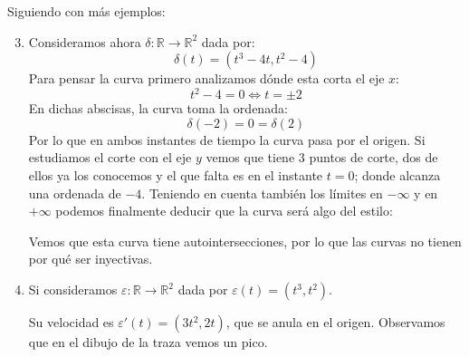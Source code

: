\begin{ejemplo}
    Siguiendo con más ejemplos:
    \begin{enumerate}
        \setcounter{enumi}{2}
        \item Consideramos ahora $\delta:\mathbb{R}\to \mathbb{R}^2$ dada por:
            \begin{equation*}
                \delta(t) = (t^3-4t, t^2-4)
            \end{equation*}
            Para pensar la curva primero analizamos dónde esta corta el eje $x$:
            \begin{equation*}
                t^2-4 = 0 \Longleftrightarrow t = \pm 2
            \end{equation*}
            En dichas abscisas, la curva toma la ordenada:
            \begin{equation*}
                \delta(-2) = 0 = \delta(2)
            \end{equation*}
            Por lo que en ambos instantes de tiempo la curva pasa por el origen. Si estudiamos el corte con el eje $y$ vemos que tiene 3 puntos de corte, dos de ellos ya los conocemos y el que falta es en el instante $t=0$; donde alcanza una ordenada de $-4$. Teniendo en cuenta también los límites en $-\infty$ y en $+\infty$ podemos finalmente deducir que la curva será algo del estilo:
            \ifshowfigures
            \begin{figure}[H]
                \centering
            \end{figure}
            \fi

            \noindent
            Vemos que esta curva tiene autointersecciones, por lo que las curvas no tienen por qué ser inyectivas.

        \item Si consideramos $\varepsilon:\mathbb{R}\to \mathbb{R}^2$ dada por $\varepsilon(t) = (t^3,t^2)$.

            Su velocidad es $\varepsilon'(t) = (3t^2, 2t)$, que se anula en el origen. Observamos que en el dibujo de la traza vemos un pico.


\end{enumerate}
\end{ejemplo}

